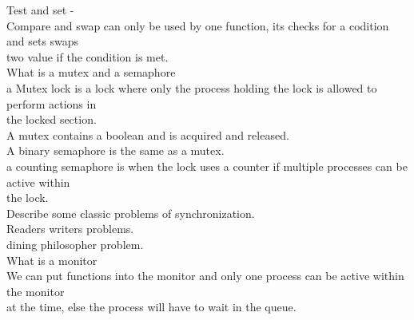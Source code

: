 \documentclass[a4paper,10pt,titlepage]{report}
\begin{document}
\hspace{10mm} Test and set - \\

\hspace{10mm}  Compare and swap can only be used by one function, its checks for a codition and sets swaps \\ \hspace{10mm}  two value if the condition is met.\\ 

What is a mutex and a semaphore \\

\hspace{10mm}  a Mutex lock is a lock where only the process holding the lock is allowed to perform actions in \\ \hspace{10mm}  	the locked section. \\
\hspace{10mm}  A mutex contains a boolean and is acquired and released.\\


\hspace{10mm}  A binary semaphore is the same as a mutex. \\

\hspace{10mm}  a counting semaphore is when the lock uses a counter if multiple processes can be active within \\
\hspace{10mm}  the lock. \\


Describe some classic problems of synchronization. \\

\hspace{10mm}  Readers writers problems.\\
\hspace{10mm} dining philosopher problem. \\


What is a monitor \\
\hspace{10mm}  We can put functions into the monitor and only one process can be active within the monitor \\
\hspace{10mm} at the time, else the process will have to wait in the queue.
\end{document}
